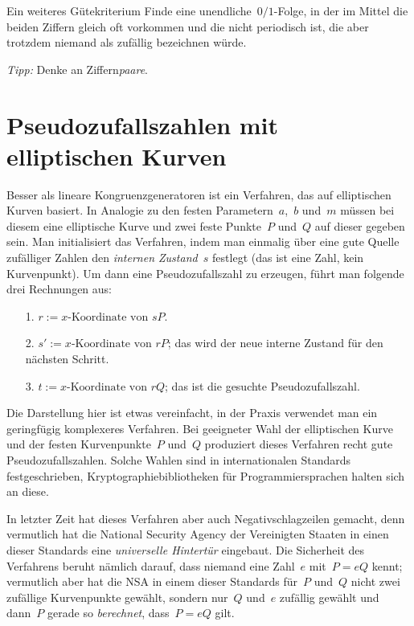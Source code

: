 \documentclass{zirkelblatt}
\newcommand{\head}[1]{\section*{\rmfamily #1}}%
\begin{document}
\begin{aufgabeShaded}{Ein weiteres Gütekriterium}
Finde eine unendliche~$0/1$-Folge, in der im Mittel die beiden Ziffern gleich
oft vorkommen und die nicht periodisch ist, die aber trotzdem niemand als
zufällig bezeichnen würde.

\emph{Tipp:} Denke an Ziffern\emph{paare}.
\end{aufgabeShaded}


\head{Pseudozufallszahlen mit elliptischen Kurven}

Besser als lineare Kongruenzgeneratoren ist ein Verfahren, das auf elliptischen
Kurven basiert. In Analogie zu den festen Parametern~$a$,~$b$ und~$m$ müssen bei
diesem eine elliptische Kurve und zwei feste Punkte~$P$ und~$Q$ auf dieser
gegeben sein. Man initialisiert das Verfahren, indem man einmalig über eine
gute Quelle zufälliger Zahlen den \emph{internen Zustand~$s$} festlegt (das ist
eine Zahl, kein Kurvenpunkt). Um dann eine Pseudozufallszahl zu erzeugen,
führt man folgende drei Rechnungen aus:

\begin{enumerate}
\item[1.] $r := \text{$x$-Koordinate von~$sP$}$.
\item[2.] $s' := \text{$x$-Koordinate von~$rP$}$; das wird der neue interne Zustand
für den nächsten Schritt.
\item[3.] $t := \text{$x$-Koordinate von~$rQ$}$; das ist die gesuchte
Pseudozufallszahl.
\end{enumerate}

Die Darstellung hier ist etwas vereinfacht, in der Praxis verwendet man ein
geringfügig komplexeres Verfahren. Bei geeigneter Wahl der
elliptischen Kurve und der festen Kurvenpunkte~$P$ und~$Q$ produziert dieses
Verfahren recht gute Pseudozufallszahlen. Solche Wahlen sind in internationalen
Standards festgeschrieben, Kryptographiebibliotheken für Programmiersprachen
halten sich an diese.

In letzter Zeit hat dieses Verfahren aber auch Negativschlagzeilen gemacht,
denn vermutlich hat die National Security Agency der Vereinigten Staaten in
einen dieser Standards eine \emph{universelle Hintertür} eingebaut. Die
Sicherheit des Verfahrens beruht nämlich darauf, dass niemand eine Zahl~$e$
mit~$P = eQ$ kennt; vermutlich aber hat die NSA in einem dieser Standards
für~$P$ und~$Q$ nicht zwei zufällige Kurvenpunkte gewählt, sondern nur~$Q$
und~$e$ zufällig gewählt und dann~$P$ gerade so \emph{berechnet}, dass~$P = eQ$
gilt.
\end{document}
